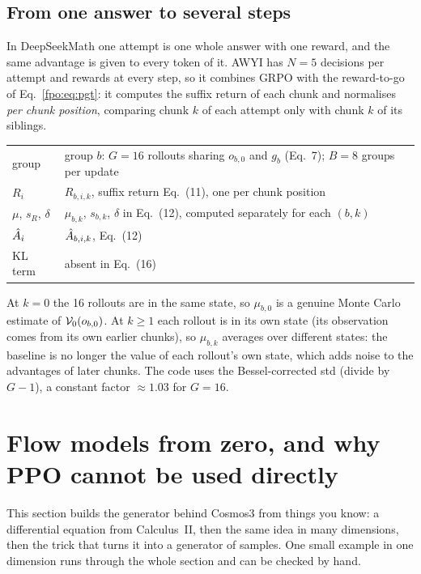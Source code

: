\subsection{From one answer to several steps}
In DeepSeekMath one attempt is one whole answer with one reward, and the same advantage is given to every token of it. AWYI has $N=5$ decisions per attempt and rewards at every step, so it combines GRPO with the reward-to-go of Eq.~\eqref{fpo:eq:pgt}: it computes the suffix return of each chunk and normalises \emph{per chunk position}, comparing chunk $k$ of each attempt only with chunk $k$ of its siblings.

\begin{paperlink}
\begin{tabular}{@{}l p{11cm}@{}}
group & group $b$: $G=16$ rollouts sharing $o_{b,0}$ and $g_b$ (Eq.~7); $B=8$ groups per update\\
$R_i$ & $R_{b,i,k}$, suffix return Eq.~(11), one per chunk position\\
$\mu$, $s_R$, $\delta$ & $\mu_{b,k}$, $s_{b,k}$, $\delta$ in Eq.~(12), computed separately for each $(b,k)$\\
$\hat A_i$ & $\hat A_{b,i,k}$, Eq.~(12)\\
KL term & absent in Eq.~(16)\\
\end{tabular}

\smallskip
At $k=0$ the 16 rollouts are in the same state, so $\mu_{b,0}$ is a genuine Monte Carlo estimate of $\mathcal{V}_0(o_{b,0})$. At $k\ge1$ each rollout is in its own state (its observation comes from its own earlier chunks), so $\mu_{b,k}$ averages over different states: the baseline is no longer the value of each rollout's own state, which adds noise to the advantages of later chunks. The code uses the Bessel-corrected std (divide by $G-1$), a constant factor $\approx1.03$ for $G=16$.
\end{paperlink}

\section{Flow models from zero, and why PPO cannot be used directly}\label{fpo:sec:flow}
This section builds the generator behind Cosmos3 from things you know: a differential equation from Calculus~II, then the same idea in many dimensions, then the trick that turns it into a generator of samples. One small example in one dimension runs through the whole section and can be checked by hand.

